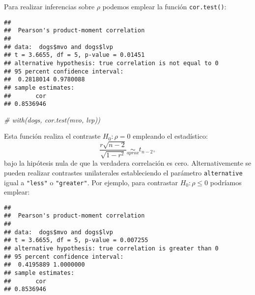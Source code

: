 \documentclass[
]{book}
\newenvironment{Shaded}{\begin{snugshade}}{\end{snugshade}}
\newcommand{\CommentTok}[1]{\textcolor[rgb]{0.56,0.35,0.01}{\textit{#1}}}
\newcommand{\DataTypeTok}[1]{\textcolor[rgb]{0.13,0.29,0.53}{#1}}
\newcommand{\KeywordTok}[1]{\textcolor[rgb]{0.13,0.29,0.53}{\textbf{#1}}}
\newcommand{\NormalTok}[1]{#1}
\newcommand{\OperatorTok}[1]{\textcolor[rgb]{0.81,0.36,0.00}{\textbf{#1}}}
\newcommand{\StringTok}[1]{\textcolor[rgb]{0.31,0.60,0.02}{#1}}
\theoremstyle{break}
\theoremstyle{definition}
\theoremstyle{definition}
\theoremstyle{definition}
\theoremstyle{remark}
\begin{document}
Para realizar inferencias sobre \(\rho\) podemos emplear la función
\texttt{cor.test()}:

\begin{Shaded}
\end{Shaded}

\begin{verbatim}
## 
##  Pearson's product-moment correlation
## 
## data:  dogs$mvo and dogs$lvp
## t = 3.6655, df = 5, p-value = 0.01451
## alternative hypothesis: true correlation is not equal to 0
## 95 percent confidence interval:
##  0.2818014 0.9780088
## sample estimates:
##       cor 
## 0.8536946
\end{verbatim}

\begin{Shaded}
\begin{Highlighting}[]
\CommentTok{# with(dogs, cor.test(mvo, lvp))}
\end{Highlighting}
\end{Shaded}

Esta función realiza el contraste \(H_0: \rho = 0\) empleando el estadístico:
\[\frac{r\sqrt{n - 2}}{\sqrt{1 - r^2}} \underset{aprox}{\sim } t_{n-2},\]
bajo la hipótesis nula de que la verdadera correlación es cero.
Alternativemente se pueden realizar contrastes unilaterales estableciendo
el parámetro \texttt{alternative} igual a \texttt{"less"} o \texttt{"greater"}.
Por ejemplo, para contrastar \(H_0: \rho \leq 0\) podríamos emplear:

\begin{Shaded}
\end{Shaded}

\begin{verbatim}
## 
##  Pearson's product-moment correlation
## 
## data:  dogs$mvo and dogs$lvp
## t = 3.6655, df = 5, p-value = 0.007255
## alternative hypothesis: true correlation is greater than 0
## 95 percent confidence interval:
##  0.4195889 1.0000000
## sample estimates:
##       cor 
## 0.8536946
\end{verbatim}
\end{document}
